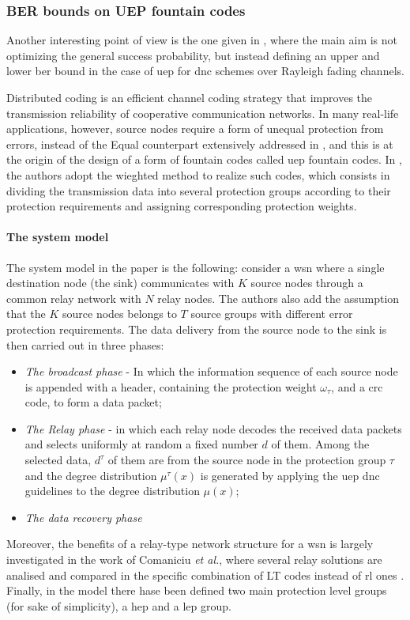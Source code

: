 \subsubsection{BER bounds on UEP fountain codes}
Another interesting point of view is the one given in \cite{Yue2014}, where the main aim is not optimizing the general success probability, but instead defining an upper and lower \gls{ber} bound in the case of \gls{uep} for \gls{dnc} schemes over Rayleigh fading channels.

Distributed coding is an efficient channel coding strategy that improves the transmission reliability of cooperative communication networks. In many real-life applications, however, source nodes require a form of unequal protection from errors, instead of the Equal counterpart extensively addressed in \cite{Pang2012}, and this is at the origin of the design of a form of fountain codes called \gls{uep} fountain codes. In \cite{Yue2014}, the authors adopt the wieghted method to realize such codes, which consists in dividing the transmission data into several protection groups according to their protection requirements and assigning corresponding protection weights.

\paragraph{The system model}
The system model in the paper is the following: consider a \gls{wsn} where a single destination node (the sink) communicates with $K$ source nodes through a common relay network with $N$ relay nodes. The authors also add the assumption that the $K$ source nodes belongs to $T$ source groups with different error protection requirements. The data delivery from the source node to the sink is then carried out in three phases:
\begin{itemize}
  \item \textit{The broadcast phase} - In which the information sequence of each source node is appended with a header, containing the protection weight $\omega_\tau$, and a \gls{crc} code, to form a data packet;
  \item \textit{The Relay phase} - in which each relay node decodes the received data packets and selects uniformly at random a fixed number $d$ of them. Among the selected data, $d^\tau$ of them are from the source node in the protection group $\tau$ and the degree distribution $\mu^\tau(x)$ is generated by applying the \gls{uep} \gls{dnc} guidelines to the degree distribution $\mu(x)$;
  \item \textit{The data recovery phase}
\end{itemize}
Moreover, the benefits of a relay-type network structure for a \gls{wsn} is largely investigated in the work of Comaniciu \textit{et al.}, where several relay solutions are analised and compared in the specific combination of LT codes instead of \gls{rl} ones \cite{Comaniciu2011}.\\
Finally, in the model there hase been defined two main protection level groups (for sake of simplicity), a \gls{hep} and a \gls{lep} group.

